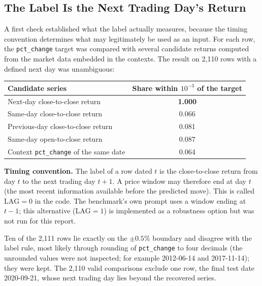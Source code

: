 \subsection{The Label Is the Next Trading Day's Return}
A first check established what the label actually measures, because the timing convention determines what may legitimately be used as an input. For each row, the \texttt{pct\_change} target was compared with several candidate returns computed from the market data embedded in the contexts. The result on 2{,}110 rows with a defined next day was unambiguous:
\begin{center}
\begin{tabular}{lc}
\toprule
Candidate series & Share within $10^{-3}$ of the target\\
\midrule
Next-day close-to-close return & \textbf{1.000}\\
Same-day close-to-close return & 0.066\\
Previous-day close-to-close return & 0.081\\
Same-day open-to-close return & 0.087\\
Context \texttt{pct\_change} of the same date & 0.064\\
\bottomrule
\end{tabular}
\end{center}
\begin{defbox}
\textbf{Timing convention.} The label of a row dated $t$ is the close-to-close return from day $t$ to the next trading day $t{+}1$. A price window may therefore end at day $t$ (the most recent information available before the predicted move). This is called $\mathrm{LAG}=0$ in the code. The benchmark's own prompt uses a window ending at $t{-}1$; this alternative ($\mathrm{LAG}=1$) is implemented as a robustness option but was not run for this report.
\end{defbox}
Ten of the 2{,}111 rows lie exactly on the $\pm0.5\%$ boundary and disagree with the label rule, most likely through rounding of \texttt{pct\_change} to four decimals (the unrounded values were not inspected; for example 2012-06-14 and 2017-11-14); they were kept. The 2{,}110 valid comparisons exclude one row, the final test date 2020-09-21, whose next trading day lies beyond the recovered series.

